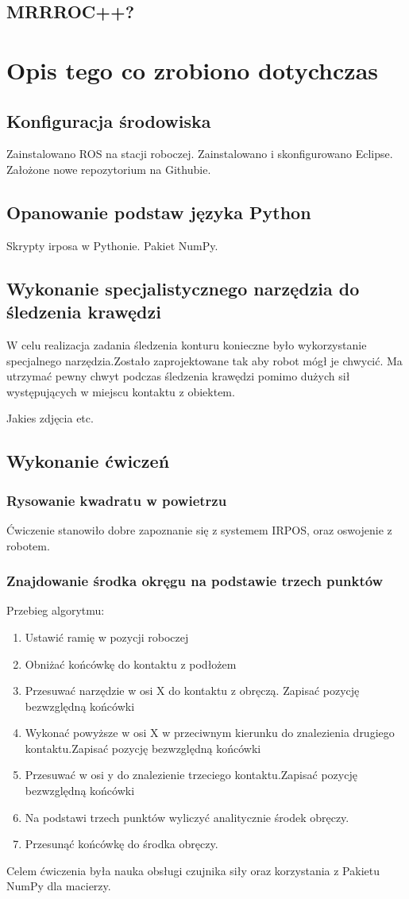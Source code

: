 \documentclass[12pt, a4paper, twoside]{book}
\begin{document}
	\section{MRRROC++?}
\chapter{Opis tego co zrobiono dotychczas}
	\section{Konfiguracja środowiska}
	Zainstalowano ROS na stacji roboczej. Zainstalowano i skonfigurowano Eclipse. Założone nowe repozytorium na Githubie.		
	\section{Opanowanie podstaw języka Python}
	Skrypty irposa w Pythonie. Pakiet NumPy.
	\section{Wykonanie specjalistycznego narzędzia do śledzenia krawędzi}
	W celu realizacja zadania śledzenia konturu konieczne było wykorzystanie specjalnego narzędzia.Zostało zaprojektowane tak aby robot mógł je chwycić. Ma utrzymać pewny chwyt podczas śledzenia krawędzi pomimo dużych sił występujących w miejscu kontaktu z obiektem.
	
	Jakies zdjęcia etc.
	\section{Wykonanie ćwiczeń}
		\subsection{Rysowanie kwadratu w powietrzu}
		Ćwiczenie stanowiło dobre zapoznanie się z systemem IRPOS, oraz oswojenie z robotem.
		\subsection{Znajdowanie środka okręgu na podstawie trzech punktów}
		Przebieg algorytmu:
			\begin{enumerate}
			\item Ustawić ramię w pozycji roboczej
			\item Obniżać końcówkę do kontaktu z podłożem
			\item Przesuwać narzędzie w osi X do kontaktu z obręczą. Zapisać pozycję bezwzględną końcówki
			\item Wykonać powyższe w osi X w przeciwnym kierunku do znalezienia drugiego kontaktu.Zapisać pozycję bezwzględną końcówki
			\item Przesuwać w osi y do znalezienie trzeciego kontaktu.Zapisać pozycję bezwzględną końcówki
			\item Na podstawi trzech punktów wyliczyć analitycznie środek obręczy.
			\item Przesunąć końcówkę do środka obręczy. 
			\end{enumerate}
		Celem ćwiczenia była nauka obsługi czujnika siły oraz korzystania z Pakietu NumPy dla macierzy.
\end{document}
